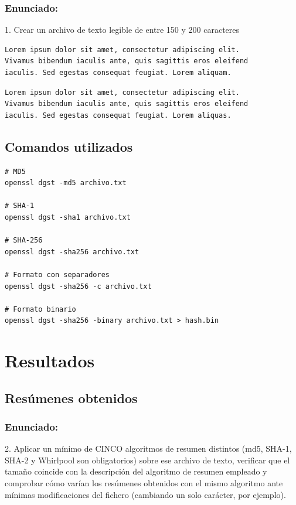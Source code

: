 \subsubsection{ Enunciado:}
1. Crear un archivo de texto legible de entre 150 y 200 caracteres
\begin{lstlisting}[caption=Contenido del archivo de prueba]
Lorem ipsum dolor sit amet, consectetur adipiscing elit. 
Vivamus bibendum iaculis ante, quis sagittis eros eleifend 
iaculis. Sed egestas consequat feugiat. Lorem aliquam.
\end{lstlisting}

\begin{lstlisting}[caption=Contenido del archivo de prueba modificado]
Lorem ipsum dolor sit amet, consectetur adipiscing elit. 
Vivamus bibendum iaculis ante, quis sagittis eros eleifend 
iaculis. Sed egestas consequat feugiat. Lorem aliquas.
\end{lstlisting}

\subsection{Comandos utilizados}

\begin{lstlisting}[caption=Cálculo de resúmenes con OpenSSL]
# MD5
openssl dgst -md5 archivo.txt

# SHA-1
openssl dgst -sha1 archivo.txt

# SHA-256
openssl dgst -sha256 archivo.txt

# Formato con separadores
openssl dgst -sha256 -c archivo.txt

# Formato binario
openssl dgst -sha256 -binary archivo.txt > hash.bin
\end{lstlisting}

\section{Resultados}

\subsection{Resúmenes obtenidos}
\subsubsection{Enunciado:}
2. Aplicar un mínimo de CINCO algoritmos de resumen distintos (md5, SHA-1, SHA-2 y
Whirlpool son obligatorios) sobre ese archivo de texto, verificar que el tamaño coincide con
la descripción del algoritmo de resumen empleado y comprobar cómo varían los resúmenes
obtenidos con el mismo algoritmo ante mínimas modificaciones del fichero (cambiando un
solo carácter, por ejemplo).

